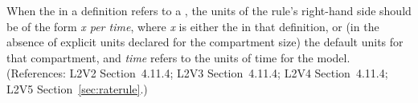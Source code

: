 When the  in a \RateRule definition refers to a
\Compartment, the units of the rule's right-hand side should be of the form
\emph{x per time}, where \emph{x} is either the  in that
\Compartment definition, or (in the absence of explicit units declared for
the compartment size) the default units for that compartment, and
\emph{time} refers to the units of time for the model.  (References: L2V2
Section~4.11.4; L2V3 Section~4.11.4; L2V4 Section~4.11.4; L2V5 Section~\ref{sec:raterule}.)
